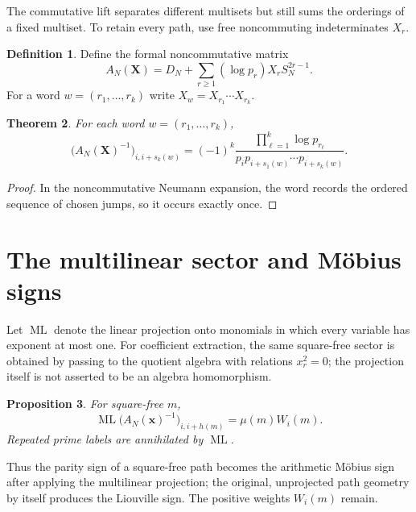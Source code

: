 \documentclass[11pt]{amsart}
\numberwithin{equation}{section}
\theoremstyle{plain}
\newtheorem{theorem}{Theorem}[section]
\newtheorem{proposition}[theorem]{Proposition}
\theoremstyle{definition}
\newtheorem{definition}[theorem]{Definition}
\theoremstyle{remark}
\newcommand{\ML}{\operatorname{ML}}
\begin{document}
The commutative lift separates different multisets but still sums the orderings of a fixed multiset.  To retain every path, use free noncommuting indeterminates $X_r$.

\begin{definition}
\label{def:noncommutative_lift}
Define the formal noncommutative matrix
\begin{equation}
A_N(\mathbf X)=D_N+\sum_{r\ge1}(\log p_r)X_rS_N^{2r-1}.
\label{eq:noncommutative_lift}
\end{equation}
For a word $w=(r_1,\ldots,r_k)$ write $X_w=X_{r_1}\cdots X_{r_k}$.
\end{definition}

\begin{theorem}
\label{thm:word_coefficient}
For each word $w=(r_1,\ldots,r_k)$,
\begin{equation}
[X_w]
\bigl(A_N(\mathbf X)^{-1}\bigr)_{i,i+s_k(w)}
=
(-1)^k
\frac{\prod_{\ell=1}^k\log p_{r_\ell}}
{p_i p_{i+s_1(w)}\cdots p_{i+s_k(w)}}.
\label{eq:word_coefficient_identity}
\end{equation}
\end{theorem}

\begin{proof}
In the noncommutative Neumann expansion, the word records the ordered sequence of chosen jumps, so it occurs exactly once.
\end{proof}

\section{The multilinear sector and M\"obius signs}
\label{sec:multilinear_mobius}

Let $\ML$ denote the linear projection onto monomials in which every variable has exponent at most one.  For coefficient extraction, the same square-free sector is obtained by passing to the quotient algebra with relations $x_r^2=0$; the projection itself is not asserted to be an algebra homomorphism.

\begin{proposition}
\label{prop:multilinear_mobius}
For square-free $m$,
\begin{equation}
[\mathbf x^{\nu(m)}]\ML
\bigl(A_N(\mathbf x)^{-1}\bigr)_{i,i+h(m)}
=
\mu(m)W_i(m).
\label{eq:multilinear_mobius_identity}
\end{equation}
Repeated prime labels are annihilated by $\ML$.
\end{proposition}

Thus the parity sign of a square-free path becomes the arithmetic M\"obius sign after applying the multilinear projection; the original, unprojected path geometry by itself produces the Liouville sign.  The positive weights $W_i(m)$ remain.
\end{document}
